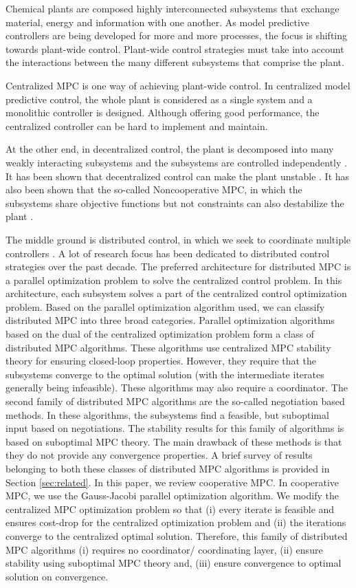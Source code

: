 \documentclass[10pt]{article}
\theoremstyle{definition}
\begin{document}
Chemical plants are composed highly interconnected subsystems that
exchange material, energy and information with one another. As model
predictive controllers are being developed for more and more
processes, the focus is shifting towards plant-wide control. Plant-wide
control strategies must take into account the interactions between the
many different subsystems that comprise the plant. 

Centralized MPC is one way of achieving plant-wide control. In centralized model predictive control, the whole plant is considered
as a single system and a monolithic controller is designed. Although
offering good performance, the centralized controller can be hard to
implement and maintain. 

At the other end, in decentralized control, the plant is
decomposed into many weakly interacting subsystems and the subsystems
are controlled independently \citep{sandell:varaiya:athans:safonov:1978}. It has been shown that decentralized
control can make the plant unstable \citep{cui:jacobsen:2002}. It has
also been shown that the so-called Noncooperative MPC, in which the
subsystems share objective functions but not constraints can also
destabilize the plant \citep{venkat:2006}.

The middle ground is distributed
control, in which we seek to coordinate multiple controllers
\citep{scattolini:2009}. A lot of research focus has been dedicated to
distributed control strategies over the past decade. The preferred architecture for distributed MPC is a
parallel optimization problem to solve the centralized control
problem. In this architecture, each subsystem solves a part of the
centralized control optimization problem. Based on the parallel
optimization algorithm used, we can classify distributed MPC into
three broad categories. Parallel optimization
algorithms based on the dual of the centralized optimization problem
form a class of distributed MPC algorithms. These algorithms use
centralized MPC stability theory for ensuring closed-loop
properties. However, they require that the subsystems converge to the
optimal solution (with the intermediate iterates generally being
infeasible). These algorithms may also require a coordinator.  The second family of distributed MPC algorithms are the
so-called negotiation based methods. In these algorithms, the
subsystems find a feasible, but suboptimal input based on
negotiations. The stability results for this family of algorithms is
based on suboptimal MPC theory. The main drawback of these methods is
that they do not provide any convergence properties. A brief survey of
results belonging to both these classes of distributed MPC algorithms
is provided in Section \ref{sec:related}. In this paper, we review
cooperative MPC. In cooperative MPC, we use the Gauss-Jacobi parallel
optimization algorithm. We modify the centralized MPC
optimization problem so that (i) every iterate is feasible and ensures
cost-drop for the centralized optimization problem and (ii) the
iterations converge to the centralized optimal solution. Therefore,
this family of distributed MPC algorithms (i) requires no coordinator/
coordinating layer, (ii) ensure stability using suboptimal MPC theory
and, (iii) ensure convergence to optimal solution on convergence. 
\end{document}
